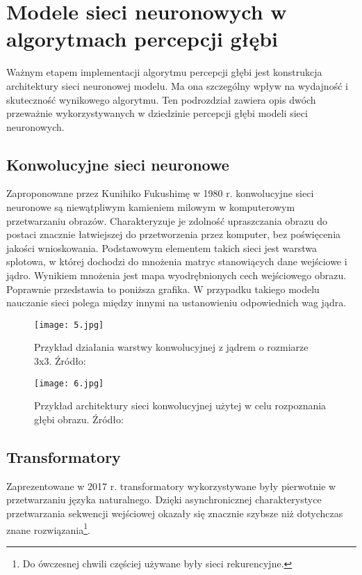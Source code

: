 \section{Modele sieci neuronowych w algorytmach percepcji głębi}
Ważnym etapem implementacji algorytmu percepcji głębi jest konstrukcja architektury sieci neuronowej modelu. Ma ona szczególny wpływ na wydajność i skuteczność wynikowego algorytmu. Ten podrozdział zawiera opis dwóch przeważnie wykorzystywanych w dziedzinie percepcji głębi modeli sieci neuronowych.
\subsection{Konwolucyjne sieci neuronowe}
Zaproponowane przez Kunihiko Fukushimę w 1980 r. \cite{fukushima1980} konwolucyjne sieci neuronowe są niewątpliwym kamieniem milowym w komputerowym przetwarzaniu obrazów. Charakteryzuje je zdolność upraszczania obrazu do postaci znacznie łatwiejszej do przetworzenia przez komputer, bez poświęcenia jakości wnioskowania. Podstawowym elementem takich sieci jest warstwa splotowa, w której dochodzi do mnożenia matryc stanowiących dane wejściowe i jądro. Wynikiem mnożenia jest mapa wyodrębnionych cech wejściowego obrazu. Poprawnie przedstawia to poniższa grafika. W przypadku takiego modelu nauczanie sieci polega między innymi na ustanowieniu odpowiednich wag jądra.
\begin{figure}[H]
    \centering
    \texttt{[image: 5.jpg]}
    \caption{Przykład działania warstwy konwolucyjnej z jądrem o rozmiarze 3x3. Źródło: \cite{dumoulin2018}}
    \label{fig:warstwa-konwolucyjna}
\end{figure}
\begin{figure}[H]
    \centering
    \texttt{[image: 6.jpg]}
    \caption{Przykład architektury sieci konwolucyjnej użytej w celu rozpoznania głębi obrazu. Źródło: \cite{dong2022}}
    \label{fig:warstwa-konwolucyjna-arch}
\end{figure}

\subsection{Transformatory}
Zaprezentowane w 2017 r. \cite{vaswani2017} transformatory wykorzystywane były pierwotnie w przetwarzaniu języka naturalnego. Dzięki asynchronicznej charakterystyce przetwarzania sekwencji wejściowej okazały się znacznie szybsze niż dotychczas znane rozwiązania\footnote{Do ówczesnej chwili częściej używane były sieci rekurencyjne.}.

